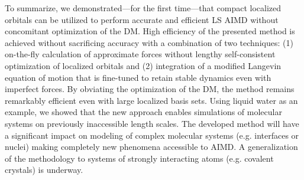 \documentclass[aip,jcp,reprint,amsmath,amssymb]{revtex4-1}
\begin{document}
To summarize, we demonstrated---for the first time---that compact localized orbitals can be utilized to perform accurate and efficient LS AIMD without concomitant optimization of the DM. %
High efficiency of the presented method is achieved without sacrificing accuracy with a combination of two techniques: (1) on-the-fly calculation of approximate forces without lengthy self-consistent optimization of localized orbitals and (2) integration of a modified Langevin equation of motion that is fine-tuned to retain stable dynamics even with imperfect forces. 
By obviating the optimization of the DM, the method remains remarkably efficient even with large localized basis sets. 
Using liquid water as an example, we showed that the new approach enables simulations of molecular systems on previously inaccessible length scales. 
The developed method will have a significant impact on modeling of complex molecular systems (e.g. interfaces or nuclei) making completely new phenomena accessible to AIMD. 
A generalization of the methodology to systems of strongly interacting atoms (e.g. covalent crystals) is underway.









\end{document}
